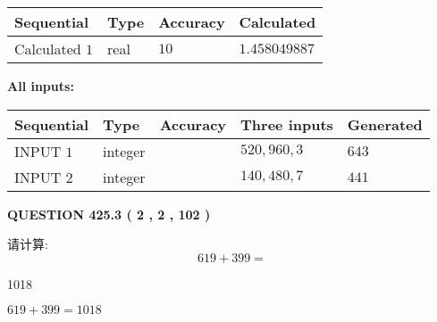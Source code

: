 \documentclass{ctexart}
\begin{document}
   
  
  
\noindent\begin{tabular}{|l|l|l|l|}
\hline
 Sequential & Type & Accuracy & Calculated \\ 
\hline
 
 
  Calculated $  1 $ & real & $  10  $ & 
 $ 1.458049887 $ 
 \\  \hline  
 \end{tabular}
   
   
   
   
\noindent\vspace{0.1in}\hspace{-0.08in} {\textbf{\Large{All inputs: }}}
   
   
  
  
\noindent\begin{tabular}{|l|l|l|l|l|}
\hline
 Sequential & Type & Accuracy & Three inputs & Generated \\ 
\hline
 
 
  INPUT $  1 $ & integer &  & $
 520
 , 
 960
 , 
 3
 $ & $ 643 $ 
 \\  \hline  
 
 
  INPUT $  2 $ & integer &  & $
 140
 , 
 480
 , 
 7
 $ & $ 441 $ 
 \\  \hline  
 \end{tabular}
   
   
  
\vspace{0.2in}
  
{\textbf{\Large{QUESTION
425.3 
 ( 2 , 2 , 102 )
}}}
  
  
 
请计算:
\begin{equation}
619 +  %
399 = \nonumber
\end{equation}
 
 
 
\noindent{}
 
 

1018
 
 
\noindent{}
 
 

 
 
 
\noindent{}
 
 

$ %
619 +  %
399=   %
1018$
 
\end{document}
